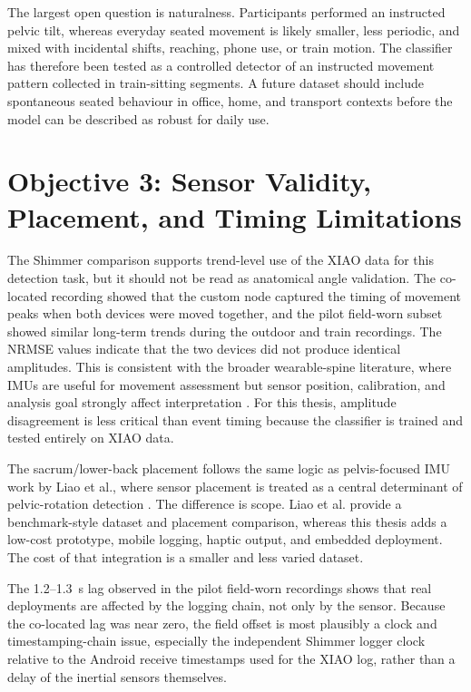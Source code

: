 The largest open question is naturalness. Participants performed an instructed pelvic tilt, whereas everyday seated movement is likely smaller, less periodic, and mixed with incidental shifts, reaching, phone use, or train motion. The classifier has therefore been tested as a controlled detector of an instructed movement pattern collected in train-sitting segments. A future dataset should include spontaneous seated behaviour in office, home, and transport contexts before the model can be described as robust for daily use.

\section{Objective 3: Sensor Validity, Placement, and Timing Limitations}

The Shimmer comparison supports trend-level use of the XIAO data for this detection task, but it should not be read as anatomical angle validation. The co-located recording showed that the custom node captured the timing of movement peaks when both devices were moved together, and the pilot field-worn subset showed similar long-term trends during the outdoor and train recordings. The NRMSE values indicate that the two devices did not produce identical amplitudes. This is consistent with the broader wearable-spine literature, where IMUs are useful for movement assessment but sensor position, calibration, and analysis goal strongly affect interpretation \cite{papi2017wearable}. For this thesis, amplitude disagreement is less critical than event timing because the classifier is trained and tested entirely on XIAO data.

The sacrum/lower-back placement follows the same logic as pelvis-focused IMU work by Liao et al., where sensor placement is treated as a central determinant of pelvic-rotation detection \cite{liao2026imu_pelvic_rotation}. The difference is scope. Liao et al. provide a benchmark-style dataset and placement comparison, whereas this thesis adds a low-cost prototype, mobile logging, haptic output, and embedded deployment. The cost of that integration is a smaller and less varied dataset.

The 1.2--1.3~s lag observed in the pilot field-worn recordings shows that real deployments are affected by the logging chain, not only by the sensor. Because the co-located lag was near zero, the field offset is most plausibly a clock and timestamping-chain issue, especially the independent Shimmer logger clock relative to the Android receive timestamps used for the XIAO log, rather than a delay of the inertial sensors themselves.

